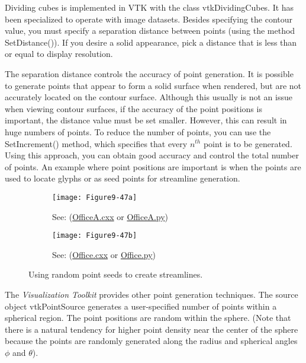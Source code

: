 Dividing cubes is implemented in VTK with the class vtkDividingCubes. It has been specialized to operate with image datasets. Besides specifying the contour value, you must specify a separation distance between points (using the method SetDistance()). If you desire a solid appearance, pick a distance that is less than or equal to display resolution.

The separation distance controls the accuracy of point generation. It is possible to generate points that appear to form a solid surface when rendered, but are not accurately located on the contour surface. Although this usually is not an issue when viewing contour surfaces, if the accuracy of the point positions is important, the distance value must be set smaller. However, this can result in huge numbers of points. To reduce the number of points, you can use the SetIncrement() method, which specifies that every $n^{th}$ point is to be generated. Using this approach, you can obtain good accuracy and control the total number of points. An example where point positions are important is when the points are used to locate glyphs or as seed points for streamline generation.

\begin{figure}[htb]
	\begin{subfigure}[h]{0.48\linewidth}
		\texttt{[image: Figure9-47a]}
		\captionsetup{justification=centering}
		\caption*{See: (\href{https://lorensen.github.io/VTKExamples/site/Cxx/VisualizationAlgorithms/OfficeA/}{OfficeA.cxx} or \href{https://lorensen.github.io/VTKExamples/site/Python/VisualizationAlgorithms/OfficeA/}{OfficeA.py})}
		\label{fig:Figure9-47a}
	\end{subfigure}
	\hfill
	\begin{subfigure}[h]{0.48\linewidth}
		\texttt{[image: Figure9-47b]}
		\captionsetup{justification=centering}
		\caption*{See: (\href{https://lorensen.github.io/VTKExamples/site/Cxx/VisualizationAlgorithms/Office/}{Office.cxx} or \href{https://lorensen.github.io/VTKExamples/site/Python/VisualizationAlgorithms/Office/}{Office.py})}
		\label{fig:Figure9-47b}
	\end{subfigure}
	\caption{Using random point seeds to create streamlines.}\label{fig:Figure9-47}
\end{figure}

The \emph{Visualization Toolkit} provides other point generation techniques. The source object vtkPointSource generates a user-specified number of points within a spherical region. The point positions are random within the sphere. (Note that there is a natural tendency for higher point density near the center of the sphere because the points are randomly generated along the radius and spherical angles $\phi$ and $\theta$).

